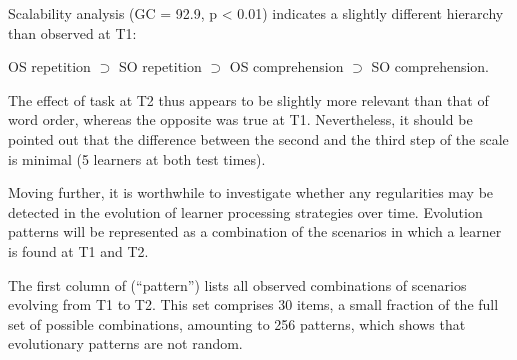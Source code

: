 \begin{table}
    \caption{Implicational hierarchy at T2}
    \label{tab:06:5}
\end{table}

Scalability analysis (GC = 92.9, p < 0.01) indicates a slightly different hierarchy than observed at T1:

OS repetition ${\supset}$ SO repetition ${\supset}$ OS comprehension ${\supset}$ SO comprehension. 

The effect of task at T2 thus appears to be slightly more relevant than that of word order, whereas the opposite was true at T1. Nevertheless, it should be pointed out that the difference between the second and the third step of the scale is minimal (5 learners at both test times).

Moving further, it is worthwhile to investigate whether any regularities may be detected in the evolution of learner processing strategies over time. Evolution patterns will be represented as a combination of the scenarios in which a learner is found at T1 and T2. 

The first column of  (“pattern”) lists all observed combinations of scenarios evolving from T1 to T2. This set comprises 30 items, a small fraction of the full set of possible combinations, amounting to 256 patterns, which shows that evolutionary patterns are not random.

